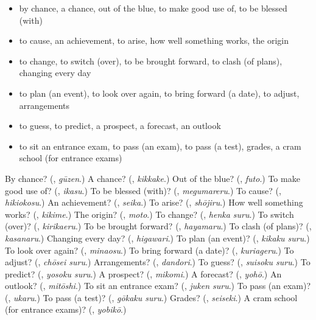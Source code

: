 \begin{itemize}
\raggedright
  \item by chance, a chance, out of the blue, to make good use of, to be blessed (with)
  \item to cause, an achievement, to arise, how well something works, the origin
  \item to change, to switch (over), to be brought forward, to clash (of plans), changing every day
  \item to plan (an event), to look over again, to bring forward (a date), to adjust, arrangements
  \item to guess, to predict, a prospect, a forecast, an outlook
  \item to sit an entrance exam, to pass (an exam), to pass (a test), grades, a cram school (for entrance exams)
\end{itemize}

\begin{tcolorbox}[breakable,colback=teal!4,colframe=teal!35!black,title={Before you move on}]
By chance? (\textbf{}, \emph{gūzen}.) A chance? (\textbf{}, \emph{kikkake}.) Out of the blue? (\textbf{}, \emph{futo}.) To make good use of? (\textbf{}, \emph{ikasu}.) To be blessed (with)? (\textbf{}, \emph{megumareru}.) To cause? (\textbf{}, \emph{hikiokosu}.) An achievement? (\textbf{}, \emph{seika}.) To arise? (\textbf{}, \emph{shōjiru}.) How well something works? (\textbf{}, \emph{kikime}.) The origin? (\textbf{}, \emph{moto}.) To change? (\textbf{}, \emph{henka suru}.) To switch (over)? (\textbf{}, \emph{kirikaeru}.) To be brought forward? (\textbf{}, \emph{hayamaru}.) To clash (of plans)? (\textbf{}, \emph{kasanaru}.) Changing every day? (\textbf{}, \emph{higawari}.) To plan (an event)? (\textbf{}, \emph{kikaku suru}.) To look over again? (\textbf{}, \emph{minaosu}.) To bring forward (a date)? (\textbf{}, \emph{kuriageru}.) To adjust? (\textbf{}, \emph{chōsei suru}.) Arrangements? (\textbf{}, \emph{dandori}.) To guess? (\textbf{}, \emph{suisoku suru}.) To predict? (\textbf{}, \emph{yosoku suru}.) A prospect? (\textbf{}, \emph{mikomi}.) A forecast? (\textbf{}, \emph{yohō}.) An outlook? (\textbf{}, \emph{mitōshi}.) To sit an entrance exam? (\textbf{}, \emph{juken suru}.) To pass (an exam)? (\textbf{}, \emph{ukaru}.) To pass (a test)? (\textbf{}, \emph{gōkaku suru}.) Grades? (\textbf{}, \emph{seiseki}.) A cram school (for entrance exams)? (\textbf{}, \emph{yobikō}.)
\end{tcolorbox}
